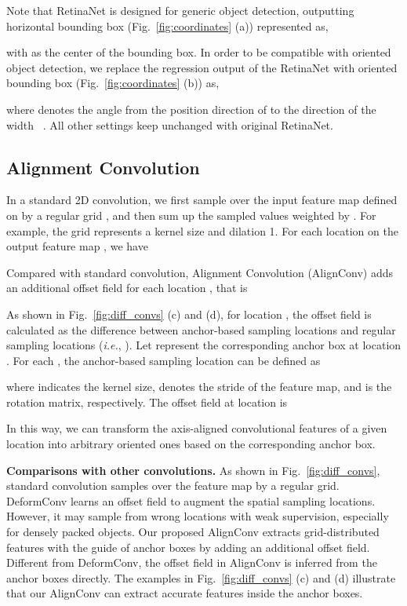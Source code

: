 \documentclass[10pt,journal,final]{IEEEtran}
\def\ie{{\em i.e.}}
\begin{document}
Note that RetinaNet is designed for generic object detection, outputting horizontal bounding box (Fig.~\ref{fig:coordinates} (a)) represented as,

with  as the center of the bounding box. 
In order to be compatible with oriented object detection, we replace the regression output of the RetinaNet with oriented bounding box (Fig.~\ref{fig:coordinates} (b)) as, 

where  denotes the angle from the position direction of  to the direction of the width ~\cite{ding2018transformer}. All other settings keep unchanged with original RetinaNet.

\vspace*{-3mm}
\subsection{Alignment Convolution}
\label{sec:alignconv}

In a standard 2D convolution, we first sample over the input feature map  defined on  by a regular grid , and then sum up the sampled values weighted by . For example, the grid  represents a kernel size  and dilation 1. For each location  on the output feature map , we have


Compared with standard convolution, Alignment Convolution (AlignConv) adds an additional offset field  for each location , that is

As shown in Fig.~\ref{fig:diff_convs} (c) and (d), for location , the offset field  is calculated as the difference between anchor-based sampling locations and regular sampling locations (\ie, ). Let  represent the corresponding anchor box at location . For each , the anchor-based sampling location  can be defined as

where  indicates the kernel size,  denotes the stride of the feature map, and  is the rotation matrix, respectively.
The offset field  at location  is

In this way, we can transform the axis-aligned convolutional features  of a given location  into arbitrary oriented ones based on the corresponding anchor box. 

{\bf Comparisons with other convolutions.} As shown in Fig.~\ref{fig:diff_convs}, standard convolution samples over the feature map by a regular grid. DeformConv learns an offset field to augment the spatial sampling locations. However, it may sample from wrong locations with weak supervision, especially for densely packed objects. Our proposed AlignConv extracts grid-distributed features with the guide of anchor boxes by adding an additional offset field. Different from DeformConv, the offset field in AlignConv is inferred from the anchor boxes directly. The examples in Fig.~\ref{fig:diff_convs} (c) and (d) illustrate that our AlignConv can extract accurate features inside the anchor boxes.
\end{document}
